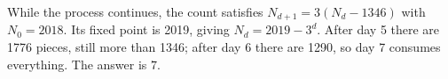 While the process continues, the count satisfies $N_{d+1}=3(N_d-1346)$ with $N_0=2018$. Its fixed point is 2019, giving $N_d=2019-3^d$. After day 5 there are 1776 pieces, still more than 1346; after day 6 there are 1290, so day 7 consumes everything. The answer is $\boxed7$.
